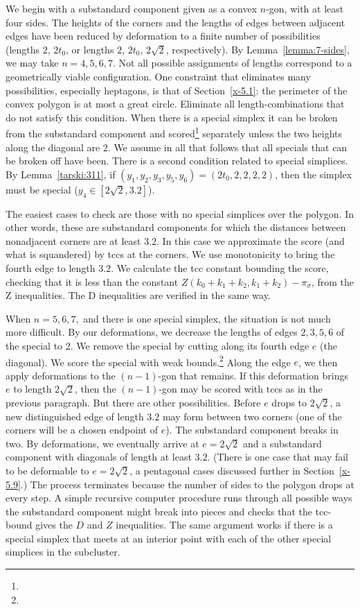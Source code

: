 We begin with a substandard component given as a convex $n$-gon, with at least
four sides.   The heights of the corners and the lengths of edges
between adjacent edges have been reduced by deformation to a finite
number of possibilities (lengths $2$, $2t_0$, or lengths $2$,
$2t_0$, $2\sqrt{2}$, respectively). By Lemma~\ref{lemma:7-sides}, we
may take $n=4,5,6,7$. Not all possible assignments of lengths
correspond to a geometrically viable configuration. One constraint
that eliminates many possibilities, especially heptagons, is that of
Section~\ref{x-5.1}: the perimeter of the convex polygon is at most
a great circle.  Eliminate all length-combinations that do not
satisfy this condition.  When there is a special simplex it can be
broken
from the substandard component and scored\footnote{} %
separately unless the two heights along the diagonal are $2$.
We assume in all that follows that all specials that can be
broken off have been. There is a second condition related to special
simplices.  By Lemma~\ref{tarski:311}, if
$(y_1,y_2,y_3,y_5,y_6)= (2t_0,2,2,2,2)$, then
the simplex must be special
($y_4\in[2\sqrt{2},3.2]$).


The easiest cases to check are those with no special simplices over the
polygon.  In other words, these are substandard components for which the distances
between nonadjacent corners are at least $3.2$.  In this case we
approximate the score (and what is squandered) by tccs at the corners.
We use monotonicity to bring the fourth edge to length $3.2$. We
calculate the tcc constant bounding the score, checking that it is less
than the constant
    $ Z(k_0+k_1+k_2,k_1+k_2) - \pi_\sigma$,
from the Z inequalities. The D inequalities  are verified in the same
way.

When $n=5,6,7,$ and there is one special simplex, the situation is not
much more difficult.  By our deformations,  we decrease the lengths of
edges $2,3,5,6$ of the special to 2. We remove the special by cutting
along its fourth edge $e$ (the diagonal).  We score the special with
weak bounds.\footnote{} %
Along the edge $e$, we then apply deformations to the $(n-1)$-gon
that remains. If this deformation brings $e$ to length
$2\sqrt{2}$, then the $(n-1)$-gon may be scored with tccs as in
the previous paragraph.  But there are other possibilities. Before
$e$ drops to $2\sqrt{2}$, a new distinguished edge of length $3.2$
may form between two corners (one of the corners will be a chosen
endpoint of $e$).  The substandard component breaks in two. By deformations,
we eventually arrive at $e=2\sqrt2$ and a substandard component with diagonals
of length at least $3.2$.  (There is one case that may fail to be
deformable to $e=2\sqrt2$, a pentagonal cases discussed further in
Section~\ref{x-5.9}.) The process terminates because the number of
sides to the polygon drops at every step. A simple recursive
computer procedure runs through all possible ways the substandard component
might break into pieces and checks that the tcc-bound gives the
$D$ and $Z$ inequalities. The same argument works if there is a
special simplex that meets at an interior point with each of the
other special simplices in the subcluster.

